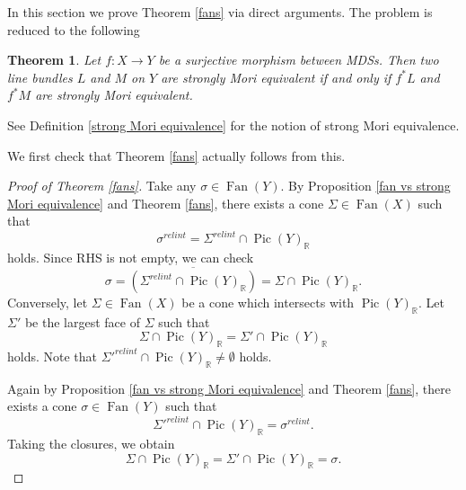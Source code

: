 \documentclass[12pt,twoside]{amsart}
\newtheorem{theo}{Theorem}[section]
\theoremstyle{definition}
\newcommand\Pic{\mathop{\mathrm{Pic}}\nolimits}
\newcommand\Fan{\mathop{\mathrm{Fan}}}
\newcommand\br{\mathbb{R}}
\begin{document}
In this section we prove Theorem \ref{fans} via direct arguments.
The problem is reduced to the following
\begin{theo}\label{comparing strong Mori equivalence}
Let $f:X\to Y$ be a surjective morphism between MDSs.
Then two line bundles $L$ and $M$ on $Y$ are strongly Mori equivalent
if and only if $f^{*}L$ and $f^{*}M$ are
strongly Mori equivalent.
\end{theo}

See Definition \ref{strong Mori equivalence} for the notion of strong Mori equivalence.

We first check that Theorem \ref{fans} actually follows from this.
\begin{proof}[Proof of Theorem \ref{fans}]
Take any $\sigma\in\Fan{(Y)}$. By Proposition \ref{fan vs strong Mori equivalence} and Theorem \ref{fans},
there exists a cone $\Sigma\in\Fan{(X)}$ such that
\begin{equation*}
\sigma^{relint}=\Sigma^{relint}\cap\Pic{(Y)}_{\br}
\end{equation*}
holds. Since RHS is not empty, we can check
\begin{equation*}
\sigma=\overline{\left(\Sigma^{relint}\cap\Pic{(Y)}_{\br}\right)}=\Sigma\cap\Pic{(Y)}_{\br}.
\end{equation*}
Conversely, let $\Sigma\in\Fan{(X)}$ be a cone which intersects with $\Pic{(Y)}_{\br}$.
Let $\Sigma'$ be the largest face of $\Sigma$ such that
\begin{equation*}
\Sigma\cap\Pic{(Y)}_{\br}=\Sigma'\cap\Pic{(Y)}_{\br}
\end{equation*}
holds. Note that
$\Sigma'^{relint}\cap\Pic{(Y)}_{\br}\not=\emptyset$ holds.

Again by Proposition \ref{fan vs strong Mori equivalence} and Theorem \ref{fans},
there exists a cone $\sigma\in\Fan{(Y)}$ such that 
\begin{equation*}
\Sigma'^{relint}\cap\Pic{(Y)}_{\br}=\sigma^{relint}.
\end{equation*}
Taking the closures, we obtain
\begin{equation*}
\Sigma\cap\Pic{(Y)}_{\br}=\Sigma'\cap\Pic{(Y)}_{\br}=\sigma.
\end{equation*}
\end{proof}
\end{document}
